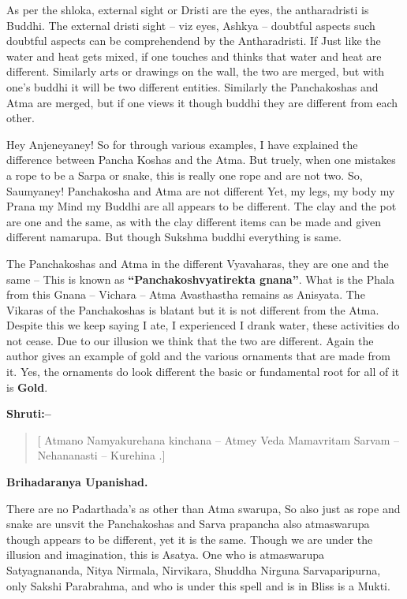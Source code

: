 As per the shloka, external sight or Dristi are the eyes, the antharadristi is Buddhi. The external dristi sight – viz eyes, Ashkya – doubtful aspects such doubtful aspects can be comprehendend by the Antharadristi. If Just like the water and heat gets mixed, if one touches and thinks that water and heat are different. Similarly arts or drawings on the wall, the two are merged, but with one's buddhi it will be two different entities. Similarly the Panchakoshas and Atma are merged, but if one views it though buddhi they are different from each other.

Hey Anjeneyaney! So for through various examples, I have explained the difference between Pancha Koshas and the Atma. But truely, when one mistakes a rope to be a Sarpa or snake, this is really one rope and are not two. So, Saumyaney! Panchakosha and Atma are not different Yet, my legs, my body my Prana my Mind my Buddhi are all appears to be different. The clay and the pot are one and the same, as with the clay different items can be made and given different namarupa. But though Sukshma buddhi everything is same.

The Panchakoshas and Atma in the different Vyavaharas, they are one and the same – This is known as \textbf{“Panchakoshvyatirekta gnana”}. What is the Phala from this Gnana – Vichara – Atma Avasthastha remains as Anisyata. The Vikaras of the Panchakoshas is blatant but it is not different from the Atma. Despite this we keep saying I ate, I experienced I drank water, these activities do not cease. Due to our illusion we think that the two are different. Again the author gives an example of gold and the various ornaments that are made from it. Yes, the ornaments do look different the basic or fundamental root for all of it is \textbf{Gold}.

\textbf{Shruti:–}

\begin{verse}
[ Atmano Namyakurehana kinchana – Atmey Veda Mamavritam Sarvam – Nehananasti – Kurehina .]
\end{verse}

\begin{flushright}
\textbf{Brihadaranya Upanishad.}
\end{flushright}

There are no Padarthada's as other than Atma swarupa, So also just as rope and snake are unsvit the Panchakoshas and Sarva prapancha also atmaswarupa though appears to be different, yet it is the same. Though we are under the illusion and imagination, this is Asatya. One who is atmaswarupa Satyagnananda, Nitya Nirmala, Nirvikara, Shuddha Nirguna Sarvaparipurna, only Sakshi Parabrahma, and who is under this spell and is in Bliss is a Mukti.

